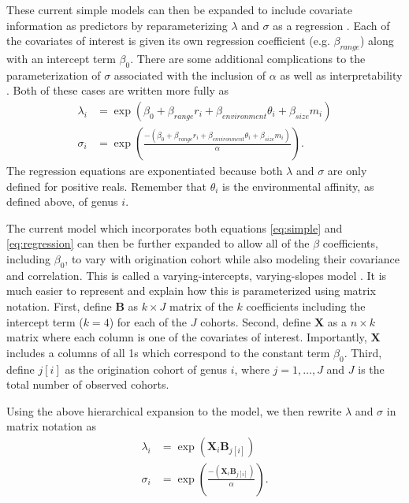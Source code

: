 \documentclass[12pt,letterpaper]{article}
\begin{document}
These current simple models can then be expanded to include covariate information as predictors by reparameterizing \(\lambda\) and \(\sigma\) as a regression \citep{Klein2003}. Each of the covariates of interest is given its own regression coefficient (e.g. \(\beta_{range}\)) along with an intercept term \(\beta_{0}\). There are some additional complications to the parameterization of \(\sigma\) associated with the inclusion of \(\alpha\) as well as interpretability \citep{Klein2003}. Both of these cases are written more fully as
\begin{equation}
  \begin{aligned}
    \lambda_{i} &= \exp(\beta_{0} + \beta_{range} r_{i} + \beta_{environment} \theta_{i} + \beta_{size} m_{i}) \\
    \sigma_{i} &= \exp\left(\frac{-(\beta_{0} + \beta_{range} r_{i} + \beta_{environment} \theta_{i} + \beta_{size} m_{i})}{\alpha}\right).
  \end{aligned}
  \label{eq:regression}
\end{equation}
The regression equations are exponentiated because both \(\lambda\) and \(\sigma\) are only defined for positive reals. Remember that \(\theta_{i}\) is the environmental affinity, as defined above, of genus \(i\).

The current model which incorporates both equations \ref{eq:simple} and \ref{eq:regression} can then be further expanded to allow all of the \(\beta\) coefficients, including \(\beta_{0}\), to vary with origination cohort while also modeling their covariance and correlation. This is called a varying-intercepts, varying-slopes model \citep{Gelman2007}. It is much easier to represent and explain how this is parameterized using matrix notation. First, define \(\mathbf{B}\) as \(k \times J\) matrix of the \(k\) coefficients including the intercept term (\(k = 4\)) for each of the \(J\) cohorts. Second, define \(\mathbf{X}\) as a \(n \times k\) matrix where each column is one of the covariates of interest. Importantly, \(\mathbf{X}\) includes a columns of all 1s which correspond to the constant term \(\beta_{0}\). Third, define \(j[i]\) as the origination cohort of genus \(i\), where \(j = 1, \dots, J\) and \(J\) is the total number of observed cohorts.

Using the above hierarchical expansion to the model, we then rewrite \(\lambda\) and \(\sigma\) in matrix notation as
\begin{equation}
  \begin{aligned}
    \lambda_{i} &= \exp(\mathbf{X}_{i} \mathbf{B}_{j[i]}) \\
    \sigma_{i} &= \exp\left(\frac{-(\mathbf{X}_{i} \mathbf{B}_{j[i]})}{\alpha}\right). 
  \end{aligned}
  \label{eq:multivariate}
\end{equation}
\end{document}

